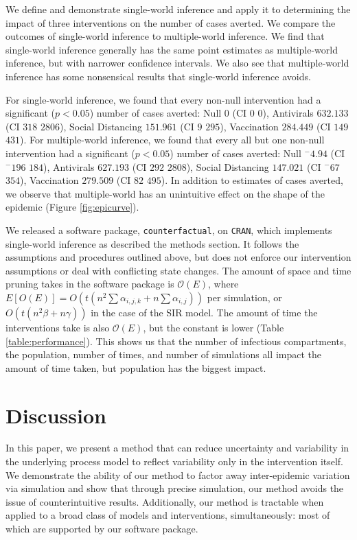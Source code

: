 \documentclass[PTRSB]{rsos}
\renewcommand{\neg}{{}^-}
\begin{document}
\begin{multicols}{2}
We define and demonstrate single-world inference and apply it to determining the impact of three interventions on the number of cases averted.
We compare the outcomes of single-world inference to multiple-world inference.
We find that single-world inference generally has the same point estimates as multiple-world inference, but with narrower confidence intervals.
We also see that multiple-world inference has some nonsensical results that single-world inference avoids.

For single-world inference, we found that every non-null intervention had a significant ($p<0.05$) number of cases averted: Null $ 0 $ (CI $ 0 $ \textemdash $ 0 $), Antivirals $ 632.133 $ (CI $ 318 $ \textemdash $ 2806 $), Social Distancing $ 151.961 $ (CI $ 9 $ \textemdash $ 295 $), Vaccination $ 284.449 $ (CI $ 149 $ \textemdash $ 431 $).
For multiple-world inference, we found that every all but one non-null intervention had a significant ($p<0.05$) number of cases averted: Null $ \neg4.94 $ (CI $ \neg196 $ \textemdash $ 184 $), Antivirals $ 627.193 $ (CI $ 292 $ \textemdash $ 2808 $), Social Distancing $ 147.021 $ (CI $ \neg67 $ \textemdash $ 354 $), Vaccination $ 279.509 $ (CI $ 82 $ \textemdash $ 495 $).
In addition to estimates of cases averted, we observe that multiple-world has an unintuitive effect on the shape of the epidemic (Figure \ref{fig:epicurve}).

We released a software package, \texttt{counterfactual}, on \texttt{CRAN}, %
which implements single-world inference as described the methods section.
It follows the assumptions and procedures outlined above, but does not enforce our intervention assumptions or deal with conflicting state changes.
The amount of space and time pruning takes in the software package is $\mathcal O(E)$, where $E[O(E)] = O(t(n^2\sum \alpha_{i,j,k} + n \sum\alpha_{i,j}))$ per simulation, or $O(t(n^2\beta + n\gamma))$ in the case of the SIR model.
The amount of time the interventions take is also $\mathcal O(E)$, but the constant is lower (Table \ref{table:performance}).
This shows us that the number of infectious compartments, the population, number of times, and number of simulations all impact the amount of time taken, but population has the biggest impact.

\section{Discussion}
In this paper, we present a method that can reduce uncertainty and variability in the underlying process model to reflect variability only in the intervention itself.
We demonstrate the ability of our method to factor away inter-epidemic variation via simulation and show that through precise simulation, our method avoids the issue of counterintuitive results. 
Additionally, our method is tractable when applied to a broad class of models and interventions, simultaneously: most of which are supported by our software package.


\end{multicols}
\end{document}
